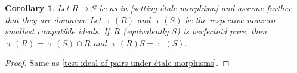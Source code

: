 \documentclass[JEP,XML,SOM,Unicode,published]{cedram}
\let\autoref\cref
\theoremstyle{plain}
\newtheorem{corollary}[theorem]{Corollary}
\theoremstyle{definition}
\numberwithin{equation}{theorem}
\begin{document}
\begin{corollary}
Let $R\to S$ be as in \autoref{setting étale morphism} and assume further that they are domains. Let $\uptau(R)$ and $\uptau(S)$ be the respective nonzero smallest compatible ideals. If~$R$ (equivalently $S$) is perfectoid pure, then $\uptau(R)=\uptau(S)\cap R$ and $\uptau(R) S=\uptau(S)$.
\end{corollary}

\begin{proof}
Same as \autoref{test ideal of pairs under étale morphisms}.
\end{proof}

\backmatter


\end{document}
